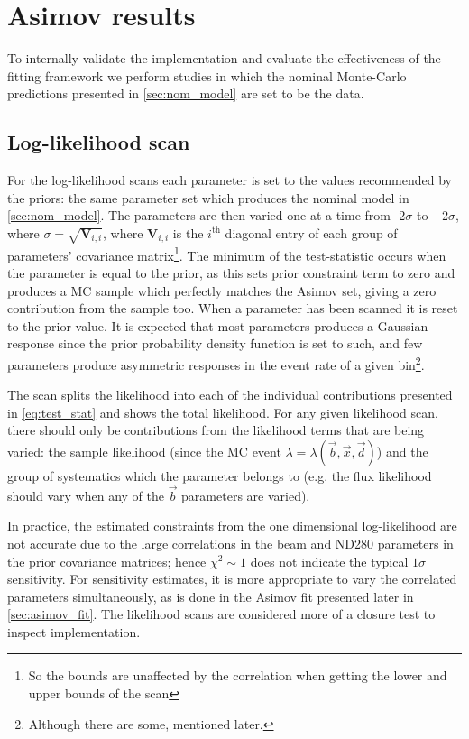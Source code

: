 \section{Asimov results}
\label{sec:asimov}
To internally validate the implementation and evaluate the effectiveness of the fitting framework we perform studies in which the nominal Monte-Carlo predictions presented in \autoref{sec:nom_model} are set to be the data.

\subsection{Log-likelihood scan}
\label{sec:llh_scan}
For the log-likelihood scans each parameter is set to the values recommended by the priors: the same parameter set which produces the nominal model in \autoref{sec:nom_model}. The parameters are then varied one at a time from -2$\sigma$ to +2$\sigma$, where $\sigma = \sqrt{\mathbf{V}_{i,i}}$, where $\mathbf{V}_{i,i}$ is the $i^{\text{th}}$ diagonal entry of each group of parameters' covariance matrix\footnote{So the bounds are unaffected by the correlation when getting the lower and upper bounds of the scan}. The minimum of the test-statistic occurs when the parameter is equal to the prior, as this sets prior constraint term to zero and produces a MC sample which perfectly matches the Asimov set, giving a zero contribution from the sample too. When a parameter has been scanned it is reset to the prior value. It is expected that most parameters produces a Gaussian response since the prior probability density function is set to such, and few parameters produce asymmetric responses in the event rate of a given bin\footnote{Although there are some, mentioned later.}.

The scan splits the likelihood into each of the individual contributions presented in \autoref{eq:test_stat} and shows the total likelihood. For any given likelihood scan, there should only be contributions from the likelihood terms that are being varied: the sample likelihood (since the MC event $\lambda=\lambda(\vec{b},\vec{x},\vec{d})$) and the group of systematics which the parameter belongs to (e.g. the flux likelihood should vary when any of the $\vec{b}$ parameters are varied).

In practice, the estimated constraints from the one dimensional log-likelihood are not accurate due to the large correlations in the beam and ND280 parameters in the prior covariance matrices; hence $\chi^2\sim1$ does not indicate the typical $1\sigma$ sensitivity. For sensitivity estimates, it is more appropriate to vary the correlated parameters simultaneously, as is done in the Asimov fit presented later in \autoref{sec:asimov_fit}. The likelihood scans are considered more of a closure test to inspect implementation.

